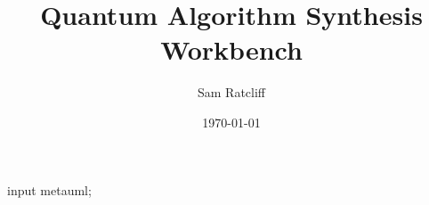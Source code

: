 \documentclass[authoryearcitations]{UoYCSproject}
\author{Sam Ratcliff}
\title{Quantum Algorithm Synthesis Workbench}
\date{\today}
\begin{document}
\begin{empfile}
\begin{empcmds}
input metauml;
\end{empcmds}

\maketitle
\listoffigures
\listoftables








% 





\appendix



\end{empfile}
\end{document}
